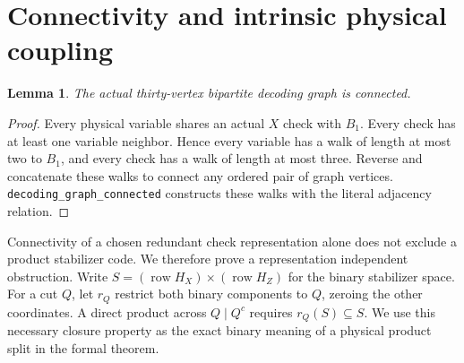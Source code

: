 \documentclass[11pt]{article}
\newtheorem{lemma}[theorem]{Lemma}
\newcommand{\row}{\operatorname{row}}
\begin{document}
\section{Connectivity and intrinsic physical coupling}\label{sec:coupling}
\begin{lemma}\label{lem:connected}
The actual thirty-vertex bipartite decoding graph is connected.
\end{lemma}
\begin{proof}
Every physical variable shares an actual $X$ check with $B_1$. Every check
has at least one variable neighbor. Hence every variable has a walk of
length at most two to $B_1$, and every check has a walk of length at most
three. Reverse and concatenate these walks to connect any ordered pair
of graph vertices. \texttt{decoding\_graph\_connected} constructs these
walks with the literal adjacency relation.
\end{proof}
Connectivity of a chosen redundant check representation alone does not
exclude a product stabilizer code. We therefore prove a representation
independent obstruction. Write
$S=(\row H_X)\times(\row H_Z)$ for the binary stabilizer space. For a cut
$Q$, let $r_Q$ restrict both binary components to $Q$, zeroing the other
coordinates. A direct product across $Q\mid Q^c$ requires $r_Q(S)\subseteq S$.
We use this necessary closure property as the exact binary meaning of a
physical product split in the formal theorem.
\end{document}
